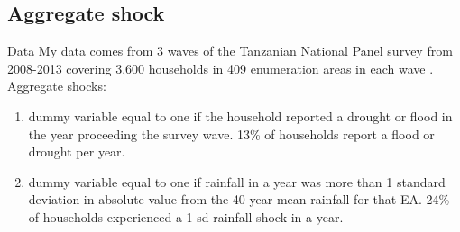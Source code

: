 \documentclass[t]{beamer}
\begin{document}
\subsection*{Aggregate shock}
\begin{frame}[label=data]{Data}
My data comes from 3 waves of the Tanzanian National Panel survey from 2008-2013 covering 3,600 households in 409 enumeration areas in each wave \hyperlink{supplemental}{}.\\ \pause
Aggregate shocks:
\begin{enumerate}
\item dummy variable equal to one if the household reported a drought or flood in the year proceeding the survey wave. 13\% of households report a flood or drought per year.
\item dummy variable equal to one if rainfall in a year was more than 1 standard deviation in absolute value from the 40 year mean rainfall for that EA. 24\% of households experienced a 1 sd rainfall shock in a year. 

\end{enumerate}

\end{frame}
\end{document}
